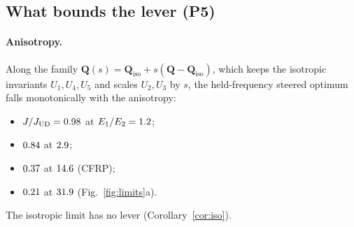 \subsection{What bounds the lever (P5)}\label{sec:limits}
\paragraph{Anisotropy.} Along the family $\bm Q(s)=\bm Q_{\mathrm{iso}}+s(\bm Q-\bm
Q_{\mathrm{iso}})$, which keeps the isotropic invariants $U_1,U_4,U_5$ and scales $U_2,U_3$
by $s$, the held-frequency steered optimum falls monotonically with the anisotropy:
\begin{itemize}[itemsep=1pt]
\item $J/J_{\mathrm{UD}}=0.98$ at $E_1/E_2=1.2$;
\item $0.84$ at $2.9$;
\item $0.37$ at $14.6$ (CFRP);
\item $0.21$ at $31.9$ (Fig.~\ref{fig:limits}a).
\end{itemize}
The isotropic limit has no lever (Corollary~\ref{cor:iso}).

